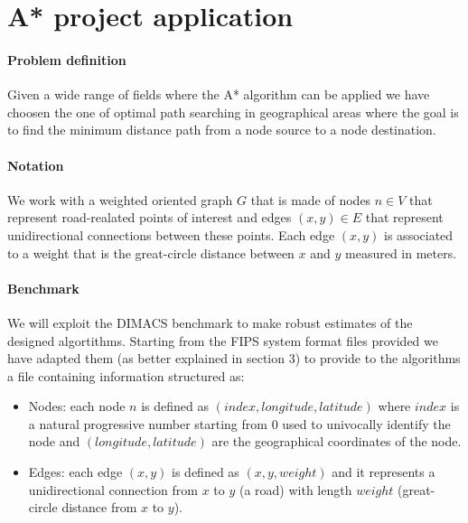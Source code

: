 \documentclass[twocolumn, switch]{article} %
\begin{document}
\section{A* project application}
\paragraph{Problem definition} Given a wide range of fields where the A* algorithm can be applied we have choosen the one of
optimal path searching in geographical areas where the goal is to find the minimum distance path from a 
node source to a node destination.

\paragraph{Notation} We work with a weighted oriented graph $G$ that is made of nodes $n \in V$ that represent
road-realated points of interest and edges $(x,y) \in E$ that represent unidirectional connections between these points.
Each edge $(x, y)$ is associated to a weight that is the great-circle distance between $x$ and $y$ measured
in meters.
\paragraph{Benchmark} We will exploit the DIMACS benchmark to make robust estimates of the designed algortithms.
Starting from the FIPS system format files provided we have adapted them (as better explained in section 3) to provide
to the algorithms a file containing information structured as:
\begin{itemize}
  \item Nodes: each node $n$ is defined as $(index, longitude, latitude)$ where $index$ is a natural progressive
        number starting from $0$ used to univocally identify the node and $(longitude, latitude)$ are the geographical
        coordinates of the node.
  \item Edges: each edge $(x, y)$ is defined as $(x, y, weight)$ and it represents a unidirectional connection
        from $x$ to $y$ (a road) with length $weight$ (great-circle distance from $x$ to $y$).
\end{itemize}
\end{document}
